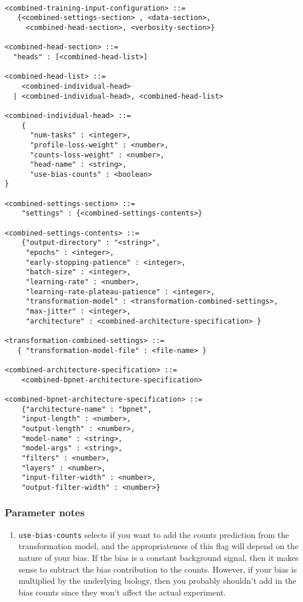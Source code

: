 \documentclass{article}
\begin{document}
\begin{lstlisting}

<combined-training-input-configuration> ::= 
   {<combined-settings-section> , <data-section>, 
     <combined-head-section>, <verbosity-section>}

<combined-head-section> ::= 
  "heads" : [<combined-head-list>]

<combined-head-list> ::= 
    <combined-individual-head>
  | <combined-individual-head>, <combined-head-list>

<combined-individual-head> ::=
    {
      "num-tasks" : <integer>,
      "profile-loss-weight" : <number>,
      "counts-loss-weight" : <number>,
      "head-name" : <string>,
      "use-bias-counts" : <boolean>
}

<combined-settings-section> ::= 
    "settings" : {<combined-settings-contents>}

<combined-settings-contents> ::= 
    {"output-directory" : "<string>",
     "epochs" : <integer>, 
     "early-stopping-patience" : <integer>, 
     "batch-size" : <integer>, 
     "learning-rate" : <number>, 
     "learning-rate-plateau-patience" : <integer>,
     "transformation-model" : <transformation-combined-settings>,
     "max-jitter" : <integer>,
     "architecture" : <combined-architecture-specification> } 

<transformation-combined-settings> ::= 
   { "transformation-model-file" : <file-name> }

<combined-architecture-specification> ::= 
    <combined-bpnet-architecture-specification>

<combined-bpnet-architecture-specification> ::= 
    {"architecture-name" : "bpnet",
    "input-length" : <number>, 
    "output-length" : <number>,
    "model-name" : <string>,
    "model-args" : <string>,
    "filters" : <number>,
    "layers" : <number>,
    "input-filter-width" : <number>,
    "output-filter-width" : <number>}
\end{lstlisting}

\subsubsection{Parameter notes}

\begin{enumerate}
    \item \texttt{use-bias-counts} selects if you want to add the counts prediction from the transformation model, and the appropriateness of this flag will depend on the nature of your bias. If the bias is a constant background signal, then it makes sense to subtract the bias contribution to the counts. However, if your bias is multiplied by the underlying biology, then you probably shouldn't add in the bias counts since they won't affect the actual experiment. 
\end{enumerate}
\end{document}
